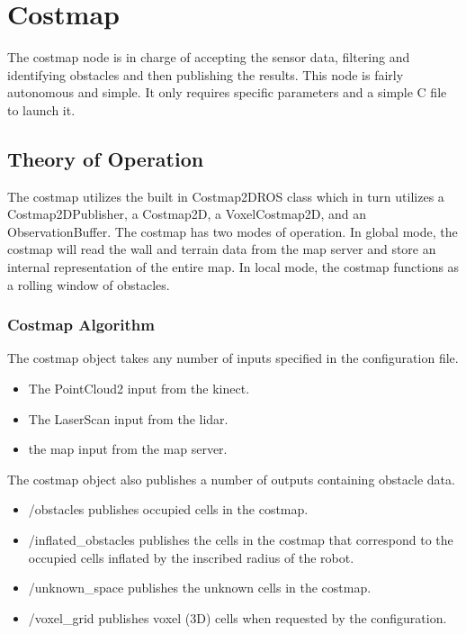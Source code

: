 \section{Costmap}

The costmap node is in charge of accepting the sensor data, filtering and 
identifying obstacles and then publishing the results. This node is fairly 
autonomous and simple. It only requires specific parameters and a simple C file 
to launch it.

\subsection{Theory of Operation}

The costmap utilizes the built in Costmap2DROS class which in turn utilizes a 
Costmap2DPublisher, a Costmap2D, a VoxelCostmap2D, and an ObservationBuffer.
The costmap has two modes of operation. In global mode, the costmap will read 
the wall and terrain data from the map server and store an internal 
representation of the entire map. In local mode, the costmap functions as a 
rolling window of obstacles.

\subsubsection{Costmap Algorithm}

The costmap object takes any number of inputs specified in the configuration 
file.

\begin{itemize}
	\item The PointCloud2 input from the kinect.
	\item The LaserScan input from the lidar.
	\item the map input from the map server.
\end{itemize}

The costmap object also publishes a number of outputs containing obstacle data.

\begin{itemize}
	\item /obstacles publishes occupied cells in the costmap.
	\item /inflated\_obstacles publishes the cells in the costmap that 
		correspond to the occupied cells inflated by the inscribed radius of the 
		robot.
	\item /unknown\_space publishes the unknown cells in the costmap.
	\item /voxel\_grid publishes voxel (3D) cells when requested by the
		configuration.
\end{itemize}


